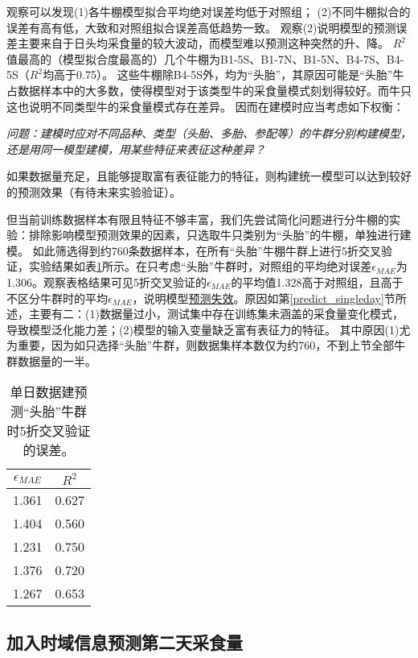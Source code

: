 观察可以发现(1)各牛棚模型拟合平均绝对误差均低于对照组；
(2)不同牛棚拟合的误差有高有低，大致和对照组拟合误差高低趋势一致。
观察(2)说明模型的预测误差主要来自于日头均采食量的较大波动，而模型难以预测这种突然的升、降。
$R^2$值最高的（模型拟合度最高的）几个牛棚为B1-5S、B1-7N、B1-5N、B4-7S、B4-5S（$R^2$均高于0.75）。
这些牛棚除B4-5S外，均为“头胎”，其原因可能是“头胎”牛占数据样本中的大多数，使得模型对于该类型牛的采食量模式刻划得较好。而牛只这也说明不同类型牛的采食量模式存在差异。
因而在建模时应当考虑如下权衡：

\emph{问题：建模时应对不同品种、类型（头胎、多胎、参配等）的牛群分别构建模型，还是用同一模型建模，用某些特征来表征这种差异？}

如果数据量充足，且能够提取富有表征能力的特征，则构建统一模型可以达到较好的预测效果（有待未来实验验证）。

但当前训练数据样本有限且特征不够丰富，我们先尝试简化问题进行分牛棚的实验：排除影响模型预测效果的因素，只选取牛只类别为“头胎”的牛棚，单独进行建模。
如此筛选得到约760条数据样本，在所有“头胎”牛棚牛群上进行5折交叉验证，实验结果如表\ref{tab:singleday_first_predict_all}所示。在只考虑“头胎”牛群时，对照组的平均绝对误差$\epsilon_{MAE}$为1.306。观察表格结果可见5折交叉验证的$\epsilon_{MAE}$的平均值1.328高于对照组，且高于不区分牛群时的平均$\epsilon_{MAE}$，说明模型\uline{预测失效}。原因如第\ref{predict_singleday}节所述，主要有二：(1)数据量过小，测试集中存在训练集未涵盖的采食量变化模式，导致模型泛化能力差；(2)模型的输入变量缺乏富有表征力的特征。
其中原因(1)尤为重要，因为如只选择“头胎”牛群，则数据集样本数仅为约760，不到上节全部牛群数据量的一半。

\begin{table}
\caption{单日数据建预测“头胎”牛群时5折交叉验证的误差。}
\begin{center}
\footnotesize
\begin{tabular}{|c|c|}
\hline
	$\epsilon_{MAE}$ & $R^2$ \\
\hline
  1.361  &  0.627 \\
 1.404  &  0.560 \\
 1.231  &  0.750 \\
 1.376  &  0.720 \\
 1.267  &  0.653 \\
\hline
\end{tabular}
\end{center}
\label{tab:singleday_first_predict_all}
\end{table}




\subsection{加入时域信息预测第二天采食量}
\label{temporal}

